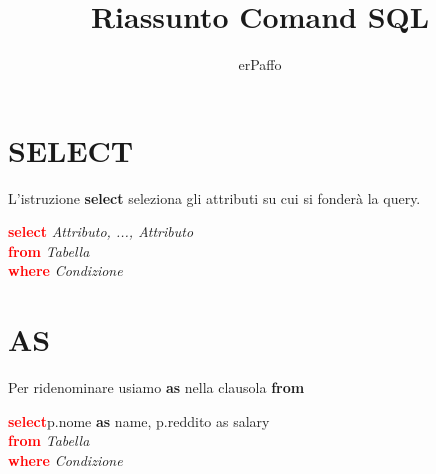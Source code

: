\documentclass[a4paper]{book}
\title{Riassunto Comand SQL}
\author{erPaffo}
\begin{document}
	\maketitle
	\tableofcontents
	\begin{frame}
		
		\section{SELECT}
		
			L'istruzione \textbf{select} seleziona gli attributi su cui si fonderà la query.  \\
			\begin{center}
			\justifying
			\textcolor{red}{\textbf{select}} \emph{Attributo, ..., Attributo}  \\
 			\textcolor{red}{\textbf{from}} \emph{Tabella}  \\
			\textcolor{red}{\textbf{where}} \emph{Condizione}  \\
			\end{center} 
		
		\section{AS}
			Per ridenominare usiamo \textbf{as} nella clausola \textbf{from}
			\begin{center}
			\justifying
			\textcolor{red}{\textbf{select}}p.nome \textbf{as} name, p.reddito as salary  \\
 			\textcolor{red}{\textbf{from}} \emph{Tabella}  \\
			\textcolor{red}{\textbf{where}} \emph{Condizione}  \\
			\end{center} 

	\end{frame}
\end{document}
